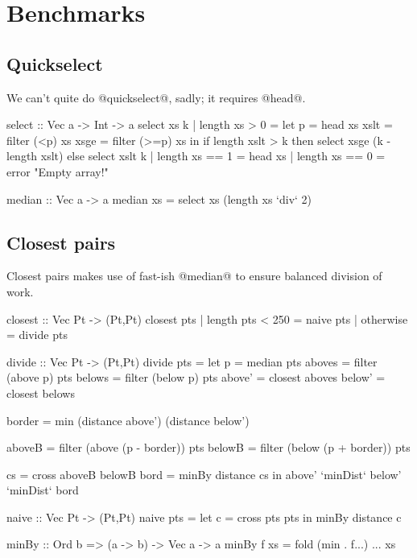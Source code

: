\section{Benchmarks}
\label{s:Benchmarks}


\subsection{Quickselect}
We can't quite do @quickselect@, sadly; it requires @head@.
\begin{code}
select :: Vec a -> Int -> a
select xs k
 | length xs > 0
 = let p    = head xs 
       xslt = filter  (<p) xs
       xsge = filter (>=p) xs
   in  if     length xslt > k
       then   select xsge (k - length xslt)
       else   select xslt  k
 | length xs == 1
 = head xs
 | length xs == 0
 = error "Empty array!"

median :: Vec a -> a
median xs
 = select xs (length xs `div` 2)
\end{code}

\subsection{Closest pairs}
Closest pairs makes use of fast-ish @median@ to ensure balanced division of work.
\begin{code}
closest :: Vec Pt -> (Pt,Pt)
closest pts
 | length pts < 250
 = naive pts
 | otherwise
 = divide pts

divide :: Vec Pt -> (Pt,Pt)
divide pts
 = let p      = median pts
       aboves = filter (above p) pts
       belows = filter (below p) pts
       above' = closest aboves
       below' = closest belows

       border = min (distance above') (distance below')

       aboveB = filter (above (p - border)) pts
       belowB = filter (below (p + border)) pts

       cs     = cross aboveB belowB
       bord   = minBy distance cs
   in  above' `minDist` below' `minDist` bord


naive :: Vec Pt -> (Pt,Pt)
naive pts
 = let c = cross pts pts
   in  minBy distance c

minBy :: Ord b => (a -> b) -> Vec a -> a
minBy f xs
 = fold (min . f...) ... xs
\end{code}

